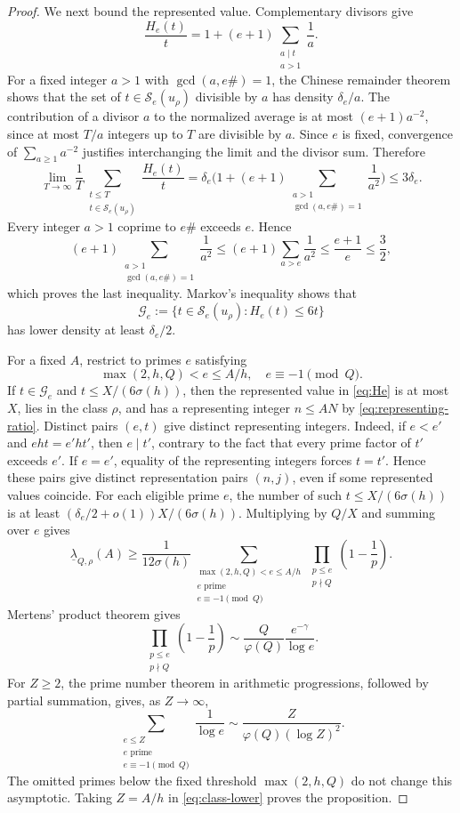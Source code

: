 \documentclass[11pt,letterpaper,reqno]{amsart}
\numberwithin{equation}{section}
\theoremstyle{remark}
\renewcommand{\leq}{\leqslant}
\renewcommand{\geq}{\geqslant}
\begin{document}
\begin{proof}
We next bound the represented value. Complementary divisors give
\[
 \frac{H_e(t)}t
 =1+(e+1)\sum_{\substack{a\mid t\\a>1}}\frac1a.
\]
For a fixed integer $a>1$ with $\gcd(a,e\#)=1$, the Chinese remainder theorem
shows that the set of $t\in\mathcal{S}_e(u_\rho)$ divisible by $a$ has density
$\delta_e/a$. The contribution of a divisor $a$ to the normalized average is at most
$(e+1)a^{-2}$, since at most $T/a$ integers up to $T$ are divisible by $a$.
Since $e$ is fixed, convergence of $\sum_{a\geq1}a^{-2}$ justifies
interchanging the limit and the divisor sum.
Therefore
\[
 \lim_{T\to\infty}\frac1T
 \sum_{\substack{t\leq T\\t\in\mathcal{S}_e(u_\rho)}}\frac{H_e(t)}t
 =\delta_e\bigg(1+(e+1)
 \sum_{\substack{a>1\\\gcd(a,e\#)=1}}\frac1{a^2}\bigg)
 \leq3\delta_e.
\]
Every integer $a>1$ coprime to $e\#$ exceeds $e$. Hence
\[
 (e+1)\sum_{\substack{a>1\\\gcd(a,e\#)=1}}\frac1{a^2}
 \leq(e+1)\sum_{a>e}\frac1{a^2}
 \leq\frac{e+1}{e}\leq\frac32,
\]
which proves the last inequality. Markov's
inequality shows that
\[
 \mathcal{G}_e:=\{t\in\mathcal{S}_e(u_\rho):H_e(t)\leq6t\}
\]
has lower density at least $\delta_e/2$.

For a fixed $A$, restrict to primes $e$ satisfying
\[
 \max(2,h,Q)<e\leq A/h,
 \quad e\equiv-1\pmod Q.
\]
If $t\in\mathcal{G}_e$ and $t\leq X/(6\sigma(h))$, then the represented value in
\eqref{eq:He} is at most $X$, lies in the class $\rho$, and has a representing integer
$n\leq AN$ by \eqref{eq:representing-ratio}. Distinct pairs $(e,t)$ give
distinct representing integers. Indeed, if $e<e'$ and $eht=e'ht'$, then $e\mid t'$,
contrary to the fact that every prime factor of $t'$ exceeds $e'$. If
$e=e'$, equality of the representing integers forces $t=t'$. Hence these pairs give distinct representation pairs $(n,j)$, even if some
represented values coincide. For each eligible prime $e$, the number of
such $t\leq X/(6\sigma(h))$ is at least
$(\delta_e/2+o(1))X/(6\sigma(h))$. Multiplying by $Q/X$ and summing over
$e$ gives
\begin{equation}\label{eq:class-lower}
 \underline{\lambda}_{Q,\rho}(A)
 \geq\frac1{12\sigma(h)}
 \sum_{\substack{\max(2,h,Q)<e\leq A/h\\
 e\text{ prime}\\e\equiv-1\pmod Q}}
 \prod_{\substack{p\leq e\\p\nmid Q}}\left(1-\frac1p\right).
\end{equation}
Mertens' product theorem gives
\[
 \prod_{\substack{p\leq e\\p\nmid Q}}
 \left(1-\frac1p\right)
 \sim\frac Q{\varphi(Q)}\frac{e^{-\gamma}}{\log e}.
\]
For $Z\geq2$, the prime number theorem in arithmetic progressions, followed
by partial summation, gives, as $Z\to\infty$,
\[
 \sum_{\substack{e\leq Z\\e\text{ prime}\\e\equiv-1\pmod Q}}
 \frac1{\log e}
 \sim\frac{Z}{\varphi(Q)(\log Z)^2}.
\]
The omitted primes below the fixed threshold $\max(2,h,Q)$ do not
change this asymptotic. Taking $Z=A/h$ in \eqref{eq:class-lower} proves the
proposition.
\end{proof}
\end{document}
